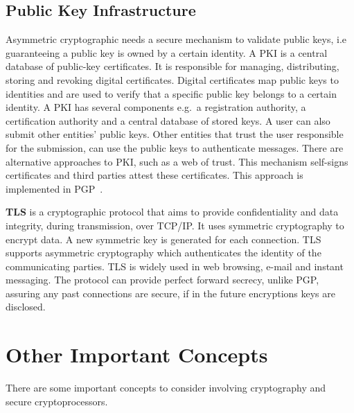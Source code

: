 \subsection{Public Key Infrastructure}\label{chap:background:PKI}

Asymmetric cryptographic needs a secure mechanism to validate public keys, i.e guaranteeing a public key is owned by a certain identity.
A \ac{PKI} is a central database of public-key certificates. It is responsible for managing, distributing, storing and revoking digital certificates. Digital certificates map public keys to identities and are used to verify that a specific public key belongs to a certain identity.
A \ac{PKI} has several components e.g.\ a registration authority, a certification authority and a central database of stored keys.
A user can also submit other entities' public keys. Other entities that trust the user responsible for the submission, can use the public keys to authenticate messages.
There are alternative approaches to \ac{PKI}, such as a web of trust. This mechanism self-signs certificates and third parties attest these certificates. This approach is implemented in \ac{PGP}~\cite{modelingPKI}.

\textbf{\ac{TLS}} is a cryptographic protocol that aims to provide confidentiality and data integrity, during transmission, over TCP/IP. It uses symmetric cryptography to encrypt data. A new symmetric key is generated for each connection.
\ac{TLS} supports asymmetric cryptography which authenticates the identity of the communicating parties.
\ac{TLS} is widely used in web browsing, e-mail and instant messaging.
The protocol can provide perfect forward secrecy, unlike \ac{PGP}, assuring any past connections are secure, if in the future encryptions keys are disclosed.



\section{Other Important Concepts}\label{chap:background:other}

There are some important concepts to consider involving cryptography and secure cryptoprocessors.

